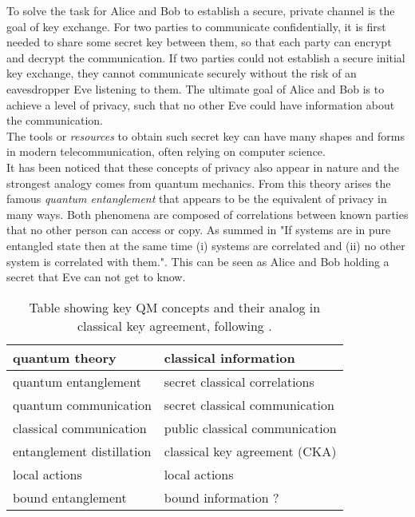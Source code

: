 

To solve the task for Alice and Bob to establish a secure, private channel is the goal of key exchange.
For two parties to communicate confidentially, it is first needed to share some secret key between them, so that each party can encrypt and decrypt the communication.
If two parties could not establish a secure initial key exchange, they cannot communicate securely without the risk of an eavesdropper Eve listening to them.
The ultimate goal of Alice and Bob is to achieve a level of privacy, such that no other Eve could have information about the communication.\\
The tools or \emph{resources} to obtain such secret key can have many shapes and forms in modern telecommunication, often relying on computer science.\\

It has been noticed that these concepts of privacy also appear in nature and the strongest analogy comes from quantum mechanics.\footnotemark 
From this theory arises the famous \emph{quantum entanglement} that appears to be the equivalent of privacy in many ways.
Both phenomena are composed of correlations between known parties that no other person can access or copy. As summed in \cite{4H07} "If systems are in pure entangled state then at the same time (i) systems are correlated and (ii) no other system is correlated with them.". 
This can be seen as Alice and Bob holding a secret that Eve can not get to know.
\begin{table}[h]
	 \centering
	 	\begin{tabular}{ l | l}
	 		\textbf{quantum theory} & \textbf{classical information} \\ 
	 		\hline 
	 		quantum entanglement & secret classical correlations \\ 
	 		quantum communication & secret classical communication \\ 
	 		classical communication & public classical communication \\ 
	 		entanglement distillation & classical key agreement (CKA) \\ 
	 		local actions & local actions \\ 
	 		bound entanglement & bound information ? \\
	 	\end{tabular} 
	 	\caption{Table showing key QM concepts and their analog in classical key agreement, following \cite{CP02}.
	 	\label{Tab:analogy}}
	 \end{table}
\\

